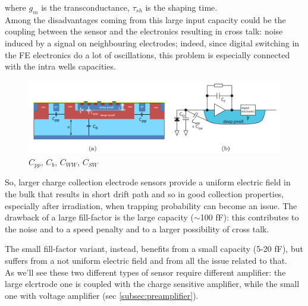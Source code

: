       where $g_m$ is the transconductance, $\tau_{sh}$ is the shaping time. \\
      Among the disadvantages coming from this large input capacity could be the coupling between the sensor and the electronics resulting in cross talk: noise induced by a signal on neighbouring electrodes; indeed, since digital switching in the FE electronics do a lot of oscillations, this problem is especially connected with the intra wells capacities.
      \begin{figure}[h!]
         \centering\includegraphics[width=12cm]{figures/Pixel_detectors/DMAPS_capacity.png}
         \caption{$C_{pp}$, $C_{b}$, $C_{WW}$, $C_{SW}$}
         \label{fig:DMAPS_capacity}
      \end{figure}
      So, larger charge collection electrode sensors provide a uniform electric field in the bulk that results in short drift path and so in good collection properties, especially after irradiation, when trapping probability can become an issue. The drawback of a large fill-factor is the large capacity ($\sim$100 fF): this contributes to the noise and to a speed penalty and to a larger possibility of cross talk.

      The small fill-factor variant, instead, benefits from a small capacity (5-20 fF), but suffers from a not uniform electric field and from all the issue related to that. \\
      As we'll see these two different types of sensor require different amplifier: the large elcrtrode one is coupled with the charge sensitive amplifier, while the small one with voltage amplifier (sec \ref{subsec:preamplifier}).

